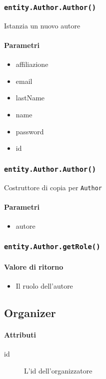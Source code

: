 \subsubsection{\texttt{entity.Author.Author()}}
Istanzia un nuovo autore
\paragraph{Parametri}
\begin{itemize}
\item affiliazione
\item email
\item lastName
\item name
\item password
\item id
\end{itemize}

\subsubsection{\texttt{entity.Author.Author()}}
Costruttore di copia per \texttt{Author}
\paragraph{Parametri}
\begin{itemize}
\item autore
\end{itemize}

\subsubsection{\texttt{entity.Author.getRole()}}
\paragraph{Valore di ritorno}
\begin{itemize}
\item Il ruolo dell'autore
\end{itemize}

\subsection{Organizer}
\paragraph{Attributi}
\begin{description}
\item[id] L'id dell'organizzatore
\end{description}

